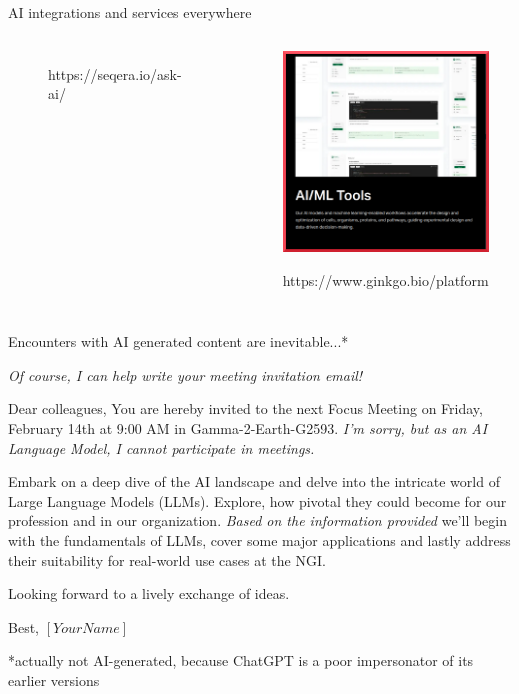 \documentclass[10pt]{beamer}
\newcommand{\credit}[1]{{\par \raggedleft \scriptsize \mdseries \color{mDarkBrown} #1 \par}}
\newcommand{\creditdark}[1]{{\par \raggedleft \scriptsize \mdseries \color{scMGray} #1 \par}}
\begin{document}
\begin{frame}{AI integrations and services everywhere}
\begin{columns}[T,onlytextwidth]
\begin{figure}
			\creditdark{https://seqera.io/ask-ai/}
		\end{figure}
		\begin{figure}
			\includegraphics[width=\textwidth]{figures/GenerativeAI_DNA_Analysis_Ginkgo.png}
			\creditdark{https://www.ginkgo.bio/platform \xspace}
		\end{figure}
	\end{columns}
\end{frame}

\begin{frame}{Encounters with AI generated content are inevitable...*}
	
	{\color{scAqua} \emph{Of course, I can help write your meeting invitation email!}}
	\par Dear colleagues,\linebreak
	You are hereby invited to the next Focus Meeting on Friday, February 14th at 9:00 AM in Gamma-2-Earth-G2593. {\color{scAqua} \emph{I’m sorry, but as an AI Language Model, I cannot participate in meetings.}}
	\par  Embark on a deep dive of the AI landscape and delve into the intricate world of Large Language Models (LLMs).
	Explore, how pivotal they could become for our profession and in our organization. {\color{scAqua} \emph{Based on the information provided}} we’ll begin with the fundamentals of LLMs, cover some major applications and lastly address their suitability for real-world use cases at the NGI.
	\par Looking forward to a lively exchange of ideas.
	\par Best,\linebreak
	{\color{scAqua} \emph{$\left[Your Name\right]$}}
	
	\credit{*actually not AI-generated, because ChatGPT is a poor impersonator of its earlier versions}
\end{frame}
\end{document}

